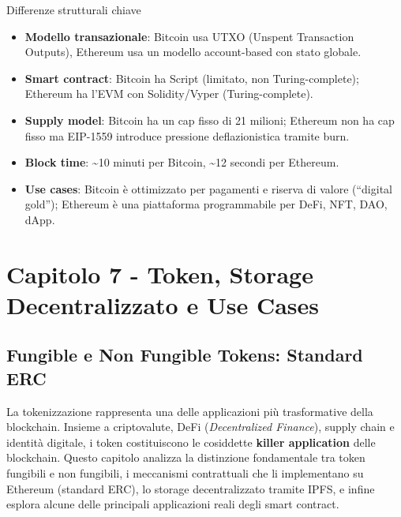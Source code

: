 \documentclass[
  italian,
  openany]{book}
\providecommand{\tightlist}{%
  \setlength{\itemsep}{0pt}\setlength{\parskip}{0pt}}
\begin{document}
\begin{calloutnote}{Differenze strutturali chiave}

\begin{itemize}
\tightlist
\item
  \textbf{Modello transazionale}: Bitcoin usa UTXO (Unspent Transaction
  Outputs), Ethereum usa un modello account-based con stato globale.
\item
  \textbf{Smart contract}: Bitcoin ha Script (limitato, non
  Turing-complete); Ethereum ha l'EVM con Solidity/Vyper
  (Turing-complete).
\item
  \textbf{Supply model}: Bitcoin ha un cap fisso di 21 milioni; Ethereum
  non ha cap fisso ma EIP-1559 introduce pressione deflazionistica
  tramite burn.
\item
  \textbf{Block time}: \textasciitilde10 minuti per Bitcoin,
  \textasciitilde12 secondi per Ethereum.
\item
  \textbf{Use cases}: Bitcoin è ottimizzato per pagamenti e riserva di
  valore (``digital gold''); Ethereum è una piattaforma programmabile
  per DeFi, NFT, DAO, dApp.
\end{itemize}

\end{calloutnote}

\newpage

\chapter{Capitolo 7 - Token, Storage Decentralizzato e Use
Cases}\label{capitolo-7---token-storage-decentralizzato-e-use-cases}

\section{Fungible e Non Fungible Tokens: Standard
ERC}\label{fungible-e-non-fungible-tokens-standard-erc}

La tokenizzazione rappresenta una delle applicazioni più trasformative
della blockchain. Insieme a criptovalute, DeFi (\emph{Decentralized
Finance}), supply chain e identità digitale, i token costituiscono le
cosiddette \textbf{killer application} delle blockchain. Questo capitolo
analizza la distinzione fondamentale tra token fungibili e non
fungibili, i meccanismi contrattuali che li implementano su Ethereum
(standard ERC), lo storage decentralizzato tramite IPFS, e infine
esplora alcune delle principali applicazioni reali degli smart contract.
\end{document}
